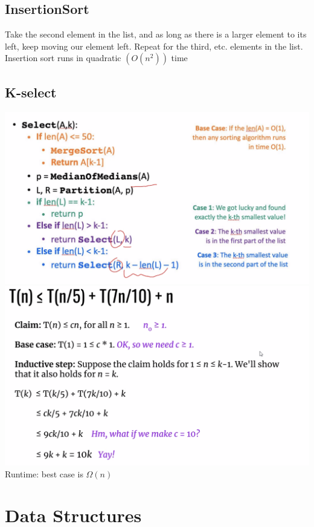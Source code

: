 \documentclass[12pt]{article}
\begin{document}
\subsection*{InsertionSort}
Take the second element in the list, and as long as there is a larger element to its left, keep moving our element left. Repeat for the third, etc. elements in the list.
Insertion sort runs in quadratic $(O(n^2))$ time
\subsection*{K-select}
\begin{center}
\includegraphics[scale=0.3]{select.png} \\
\includegraphics[scale=0.3]{kselect.png} \\
Runtime: best case is $\Omega(n)$
\end{center}
\newpage

\section{Data Structures}
\end{document}
